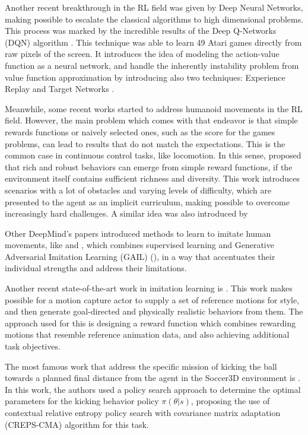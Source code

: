 Another recent breakthrough in the RL field was given by Deep Neural Networks, making possible to escalate the classical algorithms to high dimensional problems. This process was marked by the incredible results of the Deep Q-Networks (DQN) algorithm \cite{RLNature2015}. This technique was able to learn 49 Atari games directly from raw pixels of the screen. It introduces the idea of modeling the action-value function as a neural network, and handle the inherently instability problem from value function approximation by introducing also two techniques: Experience Replay \cite{ReplayBuffer} and Target Networks .

Meanwhile, some recent works started to address humanoid movements in the RL field. However, the main problem which comes with that endeavor is that simple rewards functions or naively selected ones, such as the score for the games problems, can lead to results that do not match the expectations. This is the common case in continuous control tasks, like locomotion. In this sense, \cite{deepmind1} proposed that rich and robust behaviors can emerge from simple reward functions, if the environment itself contains sufficient richness and diversity. This work introduces scenarios with a lot of obstacles and varying levels of difficulty, which are presented to the agent as an implicit curriculum, making possible to overcome increasingly hard challenges. A similar idea was also introduced by \cite{BengioCurrLearning}

Other DeepMind's papers introduced methods to learn to imitate human movements, like \cite{deepmind2} and \cite{deepmind3}, which combines supervised learning and Generative Adversarial Imitation Learning (GAIL) (\cite{gail}), in a way that accentuates their individual strengths and address their limitations.

Another recent state-of-the-art work in imitation learning is \cite{deepmimic}. This work makes possible for a motion capture actor to supply a set of reference motions for style, and then generate goal-directed and physically realistic behaviors from them. The approach used for this is designing a reward function which combines rewarding motions that resemble reference animation data, and also achieving additional task objectives.

The most famous work that address the specific mission of kicking the ball towards a planned final distance from the agent in the Soccer3D environment is \cite{abbas}. In this work, the authors used a policy search approach to determine the optimal parameters for the kicking behavior policy $\pi(\theta | s)$, proposing the use of contextual relative entropy policy search with covariance matrix adaptation (CREPS-CMA) algorithm for this task.

